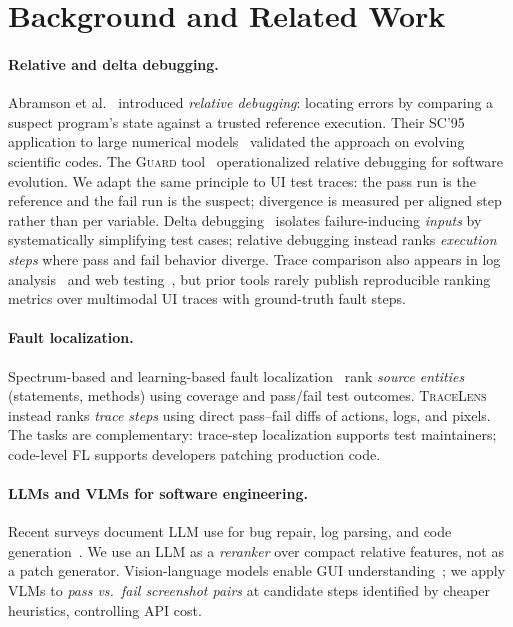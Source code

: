 \documentclass[sigconf,nonacm]{acmart}
\begin{document}
\section{Background and Related Work}
\label{sec:related}

\paragraph{Relative and delta debugging.}
Abramson et al.~\cite{abramson1996relative} introduced \emph{relative debugging}: locating errors by comparing a suspect program's state against a trusted reference execution.
Their SC'95 application to large numerical models~\cite{abramson1995sc} validated the approach on evolving scientific codes.
The \textsc{Guard} tool~\cite{sosic1997guard} operationalized relative debugging for software evolution.
We adapt the same principle to UI test traces: the pass run is the reference and the fail run is the suspect; divergence is measured per aligned step rather than per variable.
Delta debugging~\cite{zeller2002simplifying} isolates failure-inducing \emph{inputs} by systematically simplifying test cases; relative debugging instead ranks \emph{execution steps} where pass and fail behavior diverge.
Trace comparison also appears in log analysis~\cite{xu2009mining,jones2002visualization} and web testing~\cite{ricca2001testing,mesbah2012crawling}, but prior tools rarely publish reproducible ranking metrics over multimodal UI traces with ground-truth fault steps.

\paragraph{Fault localization.}
Spectrum-based and learning-based fault localization~\cite{wen2020reproducing,wong2016survey} rank \emph{source entities} (statements, methods) using coverage and pass/fail test outcomes.
\textsc{TraceLens} instead ranks \emph{trace steps} using direct pass--fail diffs of actions, logs, and pixels.
The tasks are complementary: trace-step localization supports test maintainers; code-level FL supports developers patching production code.

\paragraph{LLMs and VLMs for software engineering.}
Recent surveys document LLM use for bug repair, log parsing, and code generation~\cite{hou2024llm,brown2020language}.
We use an LLM as a \emph{reranker} over compact relative features, not as a patch generator.
Vision-language models enable GUI understanding~\cite{yao2023webarena,deng2023mind2web,zheng2024seeact}; we apply VLMs to \emph{pass vs.\ fail screenshot pairs} at candidate steps identified by cheaper heuristics, controlling API cost.
\end{document}
